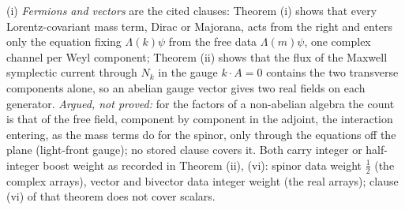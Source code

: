 (i) \emph{Fermions and vectors} are the cited clauses: Theorem (i) shows that every Lorentz-covariant mass term, Dirac or Majorana, acts from the right and enters only the equation fixing $\Lambda(k)\psi$ from the free data $\Lambda(m)\psi$, one complex channel per Weyl component; Theorem (ii) shows that the flux of the Maxwell symplectic current through $N_{k}$ in the gauge $k\cdot A = 0$ contains the two transverse components alone, so an abelian gauge vector gives two real fields on each generator. \emph{Argued, not proved:} for the factors of a non-abelian algebra the count is that of the free field, component by component in the adjoint, the interaction entering, as the mass terms do for the spinor, only through the equations off the plane (light-front gauge); no stored clause covers it. Both carry integer or half-integer boost weight as recorded in Theorem (ii), (vi): spinor data weight $\tfrac12$ (the complex arrays), vector and bivector data integer weight (the real arrays); clause (vi) of that theorem does not cover scalars.

